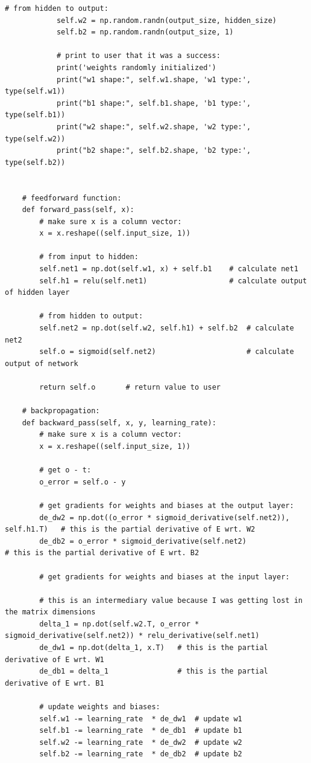 \documentclass[a4paper]{article}
\begin{document}
\begin{lstlisting}[basicstyle= \scriptsize]
            # from hidden to output:
            self.w2 = np.random.randn(output_size, hidden_size)
            self.b2 = np.random.randn(output_size, 1)

            # print to user that it was a success:
            print('weights randomly initialized')
            print("w1 shape:", self.w1.shape, 'w1 type:', type(self.w1))
            print("b1 shape:", self.b1.shape, 'b1 type:', type(self.b1))
            print("w2 shape:", self.w2.shape, 'w2 type:', type(self.w2))
            print("b2 shape:", self.b2.shape, 'b2 type:', type(self.b2))


    # feedforward function:
    def forward_pass(self, x):
        # make sure x is a column vector:
        x = x.reshape((self.input_size, 1))

        # from input to hidden:
        self.net1 = np.dot(self.w1, x) + self.b1    # calculate net1
        self.h1 = relu(self.net1)                   # calculate output of hidden layer

        # from hidden to output:
        self.net2 = np.dot(self.w2, self.h1) + self.b2  # calculate net2
        self.o = sigmoid(self.net2)                     # calculate output of network

        return self.o       # return value to user
    
    # backpropagation:
    def backward_pass(self, x, y, learning_rate):
        # make sure x is a column vector:
        x = x.reshape((self.input_size, 1))

        # get o - t:
        o_error = self.o - y

        # get gradients for weights and biases at the output layer:
        de_dw2 = np.dot((o_error * sigmoid_derivative(self.net2)), self.h1.T)   # this is the partial derivative of E wrt. W2
        de_db2 = o_error * sigmoid_derivative(self.net2)                        # this is the partial derivative of E wrt. B2

        # get gradients for weights and biases at the input layer:

        # this is an intermediary value because I was getting lost in the matrix dimensions
        delta_1 = np.dot(self.w2.T, o_error * sigmoid_derivative(self.net2)) * relu_derivative(self.net1)  
        de_dw1 = np.dot(delta_1, x.T)   # this is the partial derivative of E wrt. W1
        de_db1 = delta_1                # this is the partial derivative of E wrt. B1

        # update weights and biases:
        self.w1 -= learning_rate  * de_dw1  # update w1
        self.b1 -= learning_rate  * de_db1  # update b1
        self.w2 -= learning_rate  * de_dw2  # update w2
        self.b2 -= learning_rate  * de_db2  # update b2


\end{lstlisting}
\end{document}
